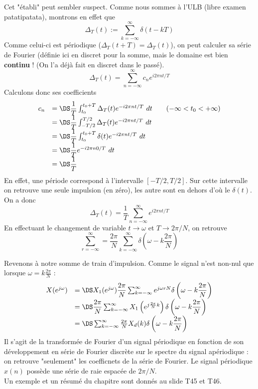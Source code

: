 Cet "établi" peut sembler suspect. Comme nous sommes à l'ULB (libre examen patatipatata), montrons 
en effet que 
\begin{equation}
\Delta_T(t) := \sum_{k=-\infty}^\infty \delta(t-kT)
\end{equation}
Comme celui-ci est périodique ($\Delta_T(t+T)=\Delta_T(t)$), on peut calculer sa série de Fourier 
(définie ici en discret pour la somme, mais le domaine est bien \textbf{continu} ! (On l'a déjà 
fait en discret dans le passé). 
\begin{equation}
\Delta_T(t) = \sum_{n=-\infty}^\infty c_ne^{i2\pi nt/T}
\end{equation}
Calculons donc ses coefficients
\begin{equation}
\begin{array}{ll}
c_n &= \DS \dfrac{1}{T}\int_{t_0}^{t_0+T} \Delta_T(t)e^{-i2\pi nt/T}\ dt\qquad (-\infty < t_0<+\infty)\\
&= \DS \dfrac{1}{T}\int_{-T/2}^{T/2} \Delta_T(t)e^{-i2\pi nt/T}\ dt \\
&= \DS \dfrac{1}{T}\int_{t_0}^{t_0+T} \delta(t) e^{-i2\pi nt/T}\ dt \\
&= \DS \dfrac{1}{T} e^{-i2\pi n0/T}\ dt\\
&= \DS \dfrac{1}{T}
\end{array}
\end{equation}
En effet, une période correspond à l'intervalle $[-T/2,T/2]$. Sur cette intervalle on retrouve une 
seule impulsion (en zéro), les autre sont en dehors d'où le $\delta(t)$. On a donc
\begin{equation}
\Delta_T(t) = \dfrac{1}{T}\sum_{n=-\infty}^\infty e^{i2\pi nt/T}
\end{equation}
En effectuant le changement de variable $t\rightarrow\omega$ et $T\rightarrow 2\pi/N$,  on retrouve
\begin{equation}
\sum_{r=-\infty}^\infty = \dfrac{2\pi}{N}\sum_{k=-\infty}^\infty \delta\left(\omega-k\frac{2\pi}{N}
\right)
\end{equation}

Revenons à notre somme de train d'impulsion. Comme le signal n'est non-nul que lorsque 
$\omega = k\frac{2\pi}{N}$ :
\begin{equation}
\begin{array}{ll}
X(e^{j\omega}) &= \DS X_1(e^{j\omega})\dfrac{2\pi}{N}\sum_{k=-\infty}^\infty e^{j\omega rN}\delta\left(
\omega-k\dfrac{2\pi}{N}\right)\\
&=\DS \dfrac{2\pi}{N}\sum_{k=-\infty}^\infty X_1\left(e^{j\frac{2\pi}{N}k}\right)\delta\left(
\omega-k\dfrac{2\pi}{N}\right)\\
&=\DS \sum_{k=-\infty}^\infty \frac{2\pi}{N} X_d(k)\delta\left(\omega-k\dfrac{2\pi}{N}\right)\\
\end{array}
\end{equation}
Il s'agit de la transformée de Fourier d'un signal périodique en fonction de son développement 
en série de Fourier discrète sur le spectre du signal apériodique : on retrouve "seulement" les 
coefficnets de la série de Fourier. Le signal périodique $x(n)$ possède une série de raie espacée de $2\pi/N$.\\

Un exemple et un résumé du chapitre sont donnés au slide T45 et T46.






